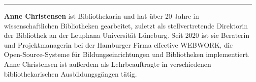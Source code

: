 \begin{center}\rule{0.5\linewidth}{0.5pt}\end{center}

\textbf{Anne Christensen} ist Bibliothekarin und hat über 20 Jahre in
wissenschaftlichen Bibliotheken gearbeitet, zuletzt als stellvertretende
Direktorin der Bibliothek an der Leuphana Universität Lüneburg. Seit
2020 ist sie Beraterin und Projektmanagerin bei der Hamburger Firma
effective WEBWORK, die Open-Source-Systeme für Bildungseinrichtungen und
Bibliotheken implementiert. Anne Christensen ist außerdem als
Lehrbeauftragte in verschiedenen bibliothekarischen Ausbildungsgängen
tätig.
